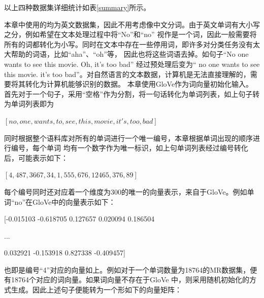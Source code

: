 以上四种数据集详细统计如表\ref{summary}所示。

\begin{table}[htb]
	\centering
	\caption{数据集数据统计}
\end{table}

本章中使用的均为英文数据集，因此不用考虑像中文分词。由于英文单词有大小写之分，例如希望在文本处理过程中将“No”和“no”
视作是一个词，因此一般需要将所有的词都转化为小写。同时在文本中存在一些停用词，即许多对分类任务没有太大帮助的词语，比如“aha”、“oh”等，
因此也将这些词语去掉。如句子“No one wants to see this movie. Oh, it's too bad” 经过预处理后变为“
no one wants to see this movie. it's too bad”。对自然语言的文本数据，计算机是无法直接理解的，需要将其转化为计算机能够识别的数据。
本章使用GloVe作为词向量初始化输入。首先对于一个句子，采用“空格”作为分割，将一句话转化为单词列表，如上句子转为单词列表即为
\centerline{$[no,one,wants,to,see,this,movie,it's,too,bad]$}

同时根据整个语料库对所有的单词进行一个唯一编号，本章根据单词出现的顺序进行编号，每个单词
均有一个数字作为唯一标识，如上句单词列表经过编号转化后，可能表示如下：

\centerline{$[4,487,3667,34,1,555,676,12465,376,89]$}

每个编号同时还对应着一个维度为300的唯一的向量表示，来自于GloVe。例如单词“no”在GloVe中的向量表示如下：


\centerline{[-0.015103  -0.618705  0.127657  0.020094  0.186504 }

\centerline{...}

\centerline{0.032921  -0.153918  0.827338  -0.409457]}

也即是编号“4”对应的向量如上。例如对于一个单词数量为18764的MR数据集，便有18764个对应的词向量。如果词向量不存在于GloVe
中，则采用随机初始化的方式生成。因此上述句子便能转为一个形如下的向量矩阵：

